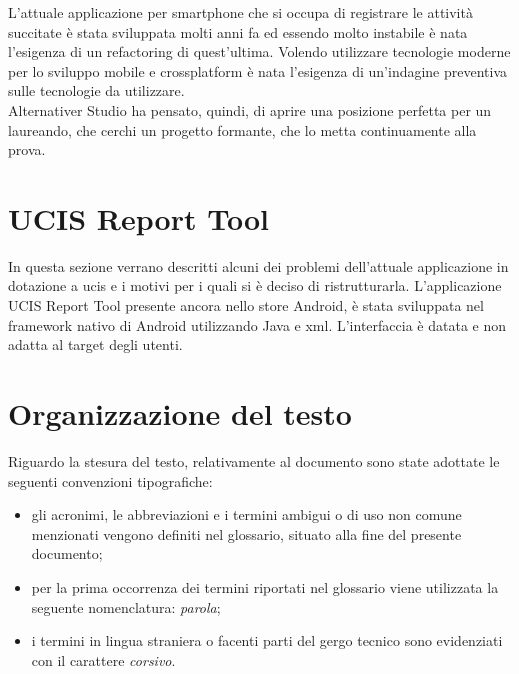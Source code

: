 L'attuale applicazione per smartphone che si occupa di registrare le attività succitate è stata sviluppata molti anni fa ed essendo molto instabile è nata l'esigenza di un refactoring di quest'ultima. Volendo utilizzare tecnologie moderne per lo sviluppo mobile e crossplatform è nata l'esigenza di un'indagine preventiva sulle tecnologie da utilizzare. \\
Alternativer Studio ha pensato, quindi, di aprire una posizione perfetta per un laureando, che cerchi un progetto formante, che lo metta continuamente alla prova.

\section{UCIS Report Tool}

In questa sezione verrano descritti alcuni dei problemi dell'attuale applicazione in dotazione a \gls{ucis} e i motivi per i quali si è deciso di ristrutturarla.
L'applicazione \gls{UCIS Report Tool} presente ancora nello store Android, è stata sviluppata nel framework nativo di Android utilizzando \gls{Java} e \gls{xml}.
L'interfaccia è datata e non adatta al target degli utenti.

\section{Organizzazione del testo}

%
%
%
%
%

Riguardo la stesura del testo, relativamente al documento sono state adottate le seguenti convenzioni tipografiche:
\begin{itemize}
	\item gli acronimi, le abbreviazioni e i termini ambigui o di uso non comune menzionati vengono definiti nel glossario, situato alla fine del presente documento;
	\item per la prima occorrenza dei termini riportati nel glossario viene utilizzata la seguente nomenclatura: \emph{parola}\glsfirstoccur;
	\item i termini in lingua straniera o facenti parti del gergo tecnico sono evidenziati con il carattere \emph{corsivo}.
\end{itemize}
